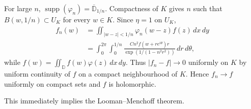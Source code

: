 \documentclass[11pt,a4paper]{article}
\begin{document}
For large $n$, $\operatorname{supp}(\varphi_n)=\overline{\mathbb D}_{1/n}$. Compactness of $K$ gives $n$ such that $B(w,1/n)\subset U_K$ for every $w\in K$.
Since $\eta=1$ on $U_K$,
\begin{align*}
f_n(w)&=\iint_{|w-z|<1/n}\varphi_n(w-z)f(z)\,dx\,dy\\
&=\int_0^{2\pi}\int_0^{1/n}
\frac{Cn^2f(w+re^{i\theta})r}{\exp(1/(1-n^2r^2))}\,dr\,d\theta,
\end{align*}
while $f(w)=\iint_{\mathbb D}f(w)\varphi(z)\,dx\,dy$. Thus $|f_n-f|\to0$ uniformly on $K$ by uniform continuity of $f$ on a compact neighbourhood of $K$. Hence $f_n\to f$ uniformly on compact sets and $f$ is holomorphic.
\begin{remark}
This immediately implies the Looman--Menchoff theorem.
\end{remark}
\end{document}
